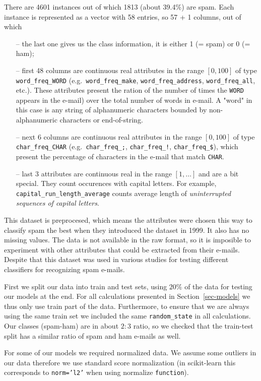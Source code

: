 \documentclass[11pt,a4paper]{article}
\begin{document}
There are 4601 instances out of which 1813 (about 39.4$\%$) are spam. Each instance is represented as a vector with 58 entries, so 57 + 1 columns, out of which
\begin{itemize}
  \item[--] the last one gives us the class information, it is either 1 (= spam) or 0 (= ham);
  \item[--] first 48 columns are continuous real attributes in the range $[0,100]$ of type {\tt word\_freq\_WORD} (e.g.\ {\tt word\_freq\_make}, {\tt word\_freq\_address}, {\tt word\_freq\_all}, etc.). 
  These attributes present the ration of the number of times the {\tt WORD} appears in the e-mail) over the total number of words in e-mail.  A "word" in this case is any 
string of alphanumeric characters bounded by non-alphanumeric characters or end-of-string.
  \item[--] next 6 columns are continuous real attributes in the range $[0,100]$ of type {\tt char\_freq\_CHAR} (e.g.\ {\tt char\_freq\_;}, {\tt char\_freq\_!}, {\tt char\_freq\_\$}), 
  which present the percentage of characters in the e-mail that match {\tt CHAR}.
  \item[--] last 3 attributes are continuous real in the range $[1,\ldots ]$ and are a bit special. They count occurences with capital letters. For example, {\tt capital\_run\_length\_average} counts average length of {\em uninterrupted sequences of capital letters}.
\end{itemize}

This dataset is preprocesed, which means the attributes were chosen this way to classify spam the best when they introduced the dataset in 1999. It also has no missing values. The data is not available in the raw format, so it is imposible to experiment with other attributes that could be extracted from their e-mails. Despite that this dataset was used in various studies for testing different classifiers for recognizing spam e-mails.

First we split our data into train and test sets, using $20\%$ of the data for testing our models at the end. For all calculations presented in Section~\ref{sec-models} we thus only use train part of the data. Furthermore, to ensure that we are always using the same train set we included the same {\tt random\_state} in all calculations. Our classes (spam-ham) are in about $2:3$ ratio, so we checked that the train-test split has a similar ratio of spam and ham e-mails as well. 

For some of our models we required normalized data. We assume some outliers in our data therefore we use standard score normalization (in scikit-learn this corresponds to {\tt norm='l2'} when using normalize {\tt function}). 
\bigskip
\end{document}

